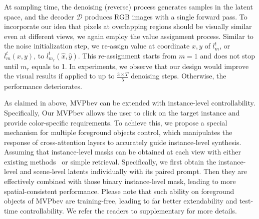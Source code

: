 At sampling time, the denoising (reverse) process generates samples in the latent space, and the decoder $\mathcal{D}$ produces RGB images with a single forward pass. To incorporate our idea that pixels at overlapping regions should be visually similar even at different views, we again employ the value assignment process. Similar to the noise initialization step, we re-assign value at coordinate $x,y$ of $l^t_m$, or $l^t_m(x,y)$, to $l^t_{m_r}(\hat{x},\hat{y})$. This re-assignment starts from $m=1$ and does not stop until $m_r$ equals to 1. In experiments, we observe that our design would improve the visual results if applied to up to $\frac{3\times T}{5}$ denoising steps. Otherwise, the performance deteriorates. %



 As claimed in above, MVPbev can be extended with instance-level controllability. Specifically, Our MVPbev allows the user to click on the target instance and provide color-specific requirements. To achieve this, we propose a special mechanism for multiple foreground objects control, which manipulates the response of cross-attention layers to accurately guide instance-level synthesis. Assuming that instance-level masks can be obtained at each view with either existing methods~\cite{cheng2022masked} or simple retrieval. Specifically, we first obtain the instance-level and scene-level latents individually with its paired prompt. Then they are effectively combined with those binary instance-level mask, leading to more spatial-consistent performance. 
Please note that such ability on foreground objects of MVPbev are training-free, leading to far better extendability and test-time controllability. We refer the readers to supplementary for more details.

